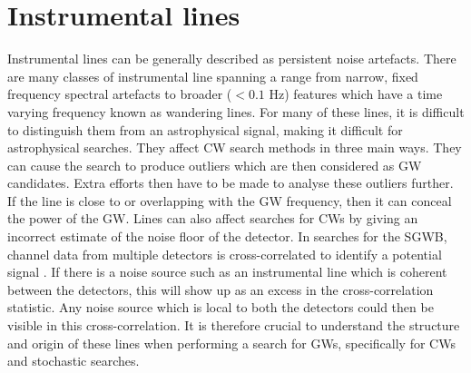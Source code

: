 \section{\label{detchar:lines}Instrumental lines}

%

Instrumental lines can be generally described as persistent noise
artefacts.  There are many classes of
instrumental line spanning a range from narrow, fixed frequency spectral
artefacts to broader ($<0.1$ Hz) features which have a time varying frequency
known as wandering lines.  For many of these lines, it is difficult to
distinguish them from an astrophysical signal, making it difficult for astrophysical searches. 
They affect \gls{CW} search methods in three main ways.  They can cause the search to produce outliers which are then
considered as \gls{GW} candidates.  Extra efforts then have to be made to
analyse these outliers further.  If the line is close to or overlapping with the \gls{GW}
frequency, then it can conceal the power of the \gls{GW}. 
Lines can also affect searches for \glspl{CW} by giving an incorrect estimate of the noise floor of the detector.
In searches for the \gls{SGWB}, channel data from multiple detectors is cross-correlated to identify a potential signal \citep{allen1999DetectingStochastic}.
If there is a noise source such as an instrumental line which is coherent between the detectors, this will show up as an excess in the cross-correlation statistic\citep{covas2018IdentificationMitigation}.
Any noise source which is local to both the detectors could then be visible in this cross-correlation.
It is therefore crucial to understand the structure and origin of these lines when performing a search for
\glspl{GW}, specifically for \glspl{CW} and stochastic searches.

%

